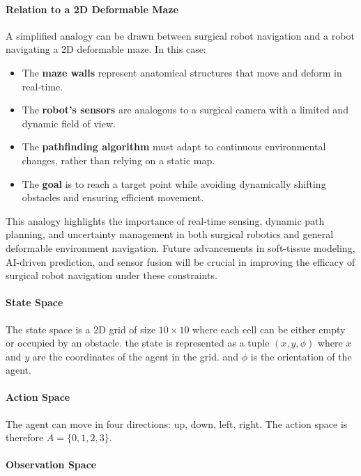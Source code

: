 \paragraph{Relation to a 2D Deformable Maze}
A simplified analogy can be drawn between surgical robot navigation and a robot navigating a 2D deformable maze. In this case:
\begin{itemize}
\item The \textbf{maze walls} represent anatomical structures that move and deform in real-time.
\item The \textbf{robot's sensors} are analogous to a surgical camera with a limited and dynamic field of view.
\item The \textbf{pathfinding algorithm} must adapt to continuous environmental changes, rather than relying on a static map.
\item The \textbf{goal} is to reach a target point while avoiding dynamically shifting obstacles and ensuring efficient movement.
\end{itemize}

This analogy highlights the importance of real-time sensing, dynamic path planning, and uncertainty management in both surgical robotics and general deformable environment navigation. Future advancements in soft-tissue modeling, AI-driven prediction, and sensor fusion will be crucial in improving the efficacy of surgical robot navigation under these constraints.



\paragraph{State Space}

The state space is a 2D grid of size $10 \times 10$ where each cell can be either empty or occupied by an obstacle.
the state is represented as a tuple $(x,y,\phi)$ where $x$ and $y$ are the coordinates of the agent in the grid.
and $\phi$ is the orientation of the agent.

\paragraph{Action Space}

The agent can move in four directions: up, down, left, right. The action space is therefore $A = \{0,1,2,3\}$.

\paragraph{Observation Space}

